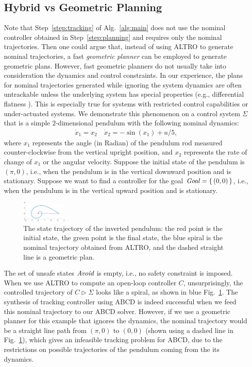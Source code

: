 \subsection{Hybrid vs Geometric Planning}
%
Note that Step~\ref{step:tracking} of Alg.~\ref{alg:main} does not use the nominal controller obtained in Step~\ref{step:planning} and requires only the nominal trajectories.
Then one could argue that, instead of using ALTRO to generate nominal trajectories, a fast \emph{geometric planner} \cite{Kavraki1996rrt} can be employed to generate geometric plans.
However, fast geometric planners do not usually take into consideration the dynamics and control constraints. In our experience, the plans for nominal trajectories generated while ignoring the system dynamics are often untrackable unless the underlying system has special properties (e.g., differential flatness \cite{Murray95differentialflatness}).
This is especially true for systems with restricted control capabilities or under-actuated systems.
We demonstrate this phenomenon on a control system $\Sigma$ that is a simple $2$-dimensional pendulum with the following nominal dynamics:
	\begin{align*}
		\dot{x}_1 = x_2\quad
		\dot{x}_2 = -\sin(x_1) + u/5,
	\end{align*}
where $x_1$ represents the angle (in Radian) of the pendulum rod measured counter-clockwise from the vertical upright position, and $x_2$ represents the rate of change of $x_1$ or the angular velocity.
Suppose the initial state of the pendulum is $(\pi,0)$, i.e., when the pendulum is in the vertical downward position and is stationary.
Suppose we want to find a controller for the goal $\mathit{Goal} = \set{(0,0)}$, i.e., when the pendulum is in the vertical upward position and is stationary.
\begin{figure}
		\includegraphics[width=0.2\textwidth]{figures/inv_final.eps}
		\caption{The state trajectory of the inverted pendulum: the red point is the initial state, the green point is the final state, the blue spiral is the nominal trajectory obtained from ALTRO, and the dashed straight line is a geometric plan.} %
		\label{fig:traj 2d pendulum}
	\end{figure}
The set of unsafe states $\mathit{Avoid}$ is empty, i.e., no safety constraint is imposed.
When we use ALTRO to compute an open-loop controller $C$, unsurprisingly, the controlled trajectory of $C\triangleright \Sigma$ looks like a spiral, as shown in blue Fig.~\ref{fig:traj 2d pendulum}.
The synthesis of tracking controller using ABCD is indeed successful when we feed this nominal trajectory to our ABCD solver.
However, if we use a geometric planner for this example that ignores the dynamics, the nominal trajectory would be a straight line path from $(\pi,0)$ to $(0,0)$ (shown using a dashed line in Fig.~\ref{fig:traj 2d pendulum}), which gives an infeasible tracking problem for ABCD, due to the restrictions on possible trajectories of the pendulum coming from the its dynamics.
	
